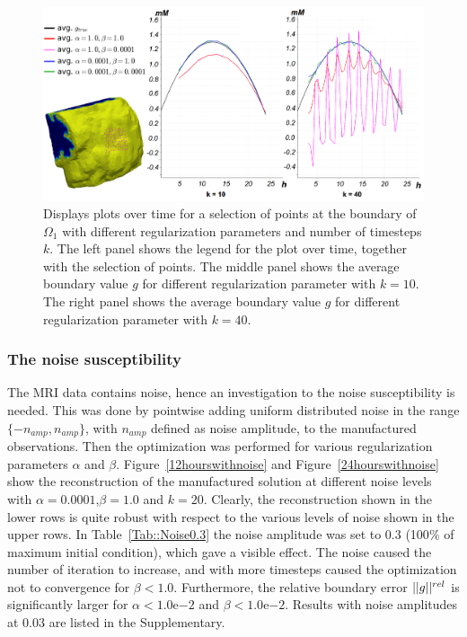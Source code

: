 \documentclass[11pt,a4paper]{article}
\begin{document}
\begin{figure}
\centering
\includegraphics[scale=0.21]{boundary_control.png}  
\caption{ Displays plots over time for a selection of points at the boundary of $\Omega_1$ with different regularization parameters and number of timesteps $k$. The left panel shows the legend for the plot over time, together with the selection of points. The middle panel shows the average boundary value $g$ for different regularization parameter with $k=10$. The right panel shows the average boundary value $g$ for different regularization parameter with $k=40$.  }
\label{boundarycontrol}
\end{figure}




\subsubsection{The noise susceptibility}
The MRI data contains noise, hence an investigation to the noise susceptibility is needed. This was done by pointwise adding uniform distributed noise in the range $\lbrace -n_{amp} , n_{amp} \rbrace $, with $n_{amp}$ defined as noise amplitude, to the manufactured observations. Then the optimization was performed for various regularization parameters $\alpha$ and $\beta$. Figure~\ref{12hourswithnoise} and Figure~\ref{24hourswithnoise} show the reconstruction of the manufactured solution at
different noise levels with $\alpha=0.0001$,$\beta=1.0$ and $k=20$. Clearly, the reconstruction shown in the lower rows is quite robust with respect to the various levels
of noise shown in the upper rows.      
In Table~\ref{Tab::Noise0.3} the noise amplitude was set to 0.3 (100$\%$ of maximum initial condition), which gave a visible effect. The noise caused the number of iteration to increase, and with more timesteps caused the optimization not to convergence for $\beta < 1.0$. Furthermore, the relative boundary error $||g||\sp{rel}$ is significantly larger for $\alpha< 1.0\mathrm{e}{-2} $ and $\beta < 1.0\mathrm{e}{-2}$. Results with noise  amplitudes at 0.03 are listed in the Supplementary. 
\end{document}
